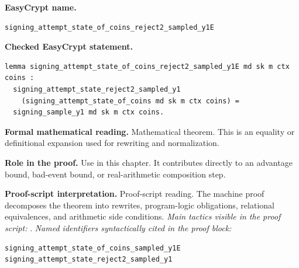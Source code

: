 \begin{formaltheorem}
\noindent\textbf{EasyCrypt name.}
\begin{lstlisting}[language=EasyCrypt,basicstyle=\ttfamily\scriptsize]
signing_attempt_state_of_coins_reject2_sampled_y1E
\end{lstlisting}
\noindent\textbf{Checked EasyCrypt statement.}
\begin{lstlisting}[language=EasyCrypt,basicstyle=\ttfamily\scriptsize]
lemma signing_attempt_state_of_coins_reject2_sampled_y1E md sk m ctx coins :
  signing_attempt_state_reject2_sampled_y1
    (signing_attempt_state_of_coins md sk m ctx coins) =
  signing_sample_y1 md sk m ctx coins.
\end{lstlisting}
\noindent\textbf{Formal mathematical reading.}
Mathematical theorem. This is an equality or definitional expansion used for rewriting and normalization.

\noindent\textbf{Role in the proof.}
Use in this chapter. It contributes directly to an advantage bound, bad-event bound, or real-arithmetic composition step.

\noindent\textbf{Proof-script interpretation.}
Proof-script reading. The machine proof decomposes the theorem into rewrites, program-logic obligations, relational equivalences, and arithmetic side conditions.
\emph{Main tactics visible in the proof script:} .
\emph{Named identifiers syntactically cited in the proof block:}
\begin{lstlisting}[language=EasyCrypt,basicstyle=\ttfamily\scriptsize]
signing_attempt_state_of_coins_sampled_y1E
signing_attempt_state_reject2_sampled_y1
\end{lstlisting}

\end{formaltheorem}

